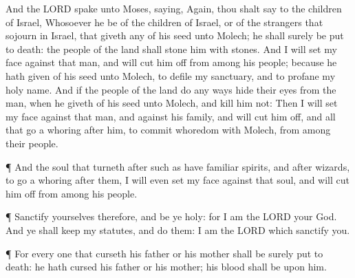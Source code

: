  And the LORD spake unto Moses, saying,  Again,
thou shalt say to the children of Israel, Whosoever he be of the
children of Israel, or of the strangers that sojourn in Israel, that
giveth any of his seed unto Molech; he shall surely be put to death: the
people of the land shall stone him with stones.  And I will
set my face against that man, and will cut him off from among his
people; because he hath given of his seed unto Molech, to defile my
sanctuary, and to profane my holy name.  And if the people
of the land do any ways hide their eyes from the man, when he giveth of
his seed unto Molech, and kill him not:  Then I will set my
face against that man, and against his family, and will cut him off, and
all that go a whoring after him, to commit whoredom with Molech, from
among their people.

 ¶ And the soul that turneth after such as have familiar
spirits, and after wizards, to go a whoring after them, I will even set
my face against that soul, and will cut him off from among his people.

 ¶ Sanctify yourselves therefore, and be ye holy: for I am
the LORD your God.  And ye shall keep my statutes, and do
them: I am the LORD which sanctify you.

 ¶ For every one that curseth his father or his mother shall
be surely put to death: he hath cursed his father or his mother; his
blood shall be upon him.

